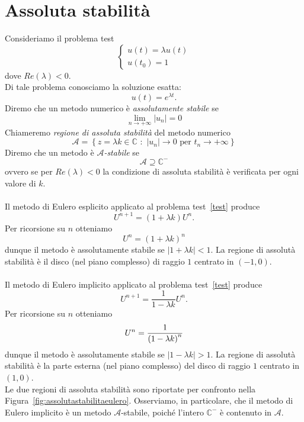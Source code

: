 \section{Assoluta stabilit\`a}
Consideriamo il problema test 
\begin{equation}	
\label{test}
\begin{cases}u(t) = \lambda u(t) \\
u\left(t_0\right) = 1
\end{cases}
\end{equation}
dove $Re(\lambda) <0$.\\
Di tale problema conosciamo la soluzione esatta:  $$u(t) = e^{\lambda t}.$$
Diremo che un metodo numerico \`e \textit{assolutamente stabile} se 
$$ \lim_{n\to + \infty} \left| u_n \right| = 0 $$ 
Chiameremo \textit{regione di assoluta stabilit\`a} del metodo numerico 
$$\mathcal{A}=\left\{ z = \lambda k \in \mathbb{C}\,\, :\,\, | u_n| \to 0 \text{ per } t_n \to +\infty\right\}$$ 
Diremo che un metodo \`e $\mathcal{A}$\textit{-stabile} se 
$$ \mathcal{A}\supseteq \mathbb{C}^-$$
ovvero se per $Re(\lambda)<0$ la condizione di assoluta stabilit\`a \`e verificata per ogni valore di $k$. \\ \\
Il metodo di Eulero esplicito applicato al problema test~\eqref{test} produce
$$ U^{n+1} = (1 + \lambda k) U^n.$$
Per ricorsione su $n$ otteniamo 
$$ U^n = (1 + \lambda k)^n $$ 
dunque il metodo \`e assolutamente stabile se $ | 1 + \lambda k |< 1$.  La regione di assolut\`a stabilit\`a \`e  il disco (nel piano complesso) di raggio $1$ centrato in $(-1,0)$.\\ \\

Il metodo di Eulero implicito  applicato al problema test~\eqref{test} produce 
$$ U^{n+1} = \frac{1}{1-\lambda k} U^n.$$
Per ricorsione su $n$ otteniamo  
$$ U^n = \frac{ 1}{\left(  1 - \lambda k \right)^n}$$
dunque il metodo \`e assolutamente stabile se $| 1 - \lambda k| >1$. La regione di assolut\`a stabilit\`a \`e la parte esterna (nel piano complesso) del disco di raggio $1$ centrato in $(1,0)$.\\

Le due regioni di assoluta stabilit\`a sono riportate per confronto nella Figura~\ref{fig:assolutastabilitaeulero}. Osserviamo, in particolare, che il metodo di Eulero implicito \`e un metodo $\mathcal{A}$-stabile, poich\'e l'intero $\mathbb{C}^{-}$ \`e contenuto in $\mathcal{A}$.

